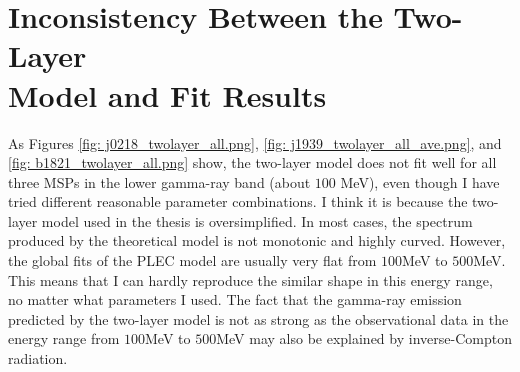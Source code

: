 \documentclass[a4paper, 12pt]{report}
\begin{document}

  \section{Inconsistency Between the Two-Layer \\ Model and Fit Results}
    As Figures \ref{fig: j0218_twolayer_all.png}, \ref{fig: j1939_twolayer_all_ave.png}, and 
    \ref{fig: b1821_twolayer_all.png} show, the two-layer model does not fit well for all 
    three MSPs in the lower gamma-ray band (about $100$ MeV), even though
    I have tried different reasonable parameter combinations.  
    I think it is because the two-layer model used in the thesis is oversimplified. In 
    most cases, the spectrum produced by the theoretical model is not monotonic and highly 
    curved. However, the global fits of the PLEC model are usually very flat from $100$MeV 
    to $500$MeV. This means that I can hardly reproduce the similar shape in this energy 
    range, no matter what parameters I used. The fact that the gamma-ray emission predicted
    by the two-layer model is not as strong as the observational data in the energy range 
    from $100$MeV to $500$MeV may also be explained by inverse-Compton radiation. 

    
    
   

  
\end{document}
